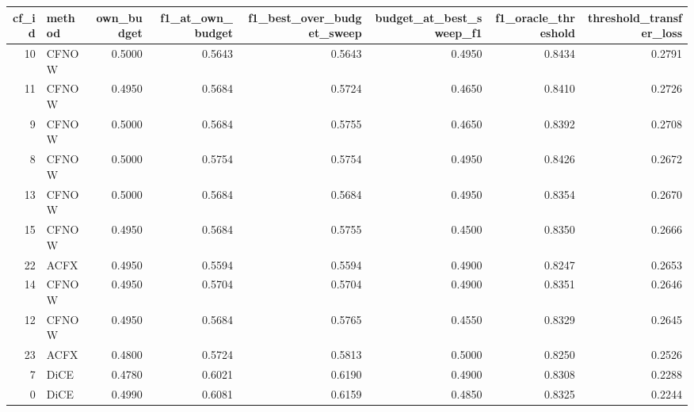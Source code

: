 \begin{tabular}{rlrrrrrr}
\toprule
 cf\_id & method &  own\_budget &  f1\_at\_own\_budget &  f1\_best\_over\_budget\_sweep &  budget\_at\_best\_sweep\_f1 &  f1\_oracle\_threshold &  threshold\_transfer\_loss \\
\midrule
    10 &  CFNOW &      0.5000 &            0.5643 &                     0.5643 &                   0.4950 &               0.8434 &                   0.2791 \\
    11 &  CFNOW &      0.4950 &            0.5684 &                     0.5724 &                   0.4650 &               0.8410 &                   0.2726 \\
     9 &  CFNOW &      0.5000 &            0.5684 &                     0.5755 &                   0.4650 &               0.8392 &                   0.2708 \\
     8 &  CFNOW &      0.5000 &            0.5754 &                     0.5754 &                   0.4950 &               0.8426 &                   0.2672 \\
    13 &  CFNOW &      0.5000 &            0.5684 &                     0.5684 &                   0.4950 &               0.8354 &                   0.2670 \\
    15 &  CFNOW &      0.4950 &            0.5684 &                     0.5755 &                   0.4500 &               0.8350 &                   0.2666 \\
    22 &   ACFX &      0.4950 &            0.5594 &                     0.5594 &                   0.4900 &               0.8247 &                   0.2653 \\
    14 &  CFNOW &      0.4950 &            0.5704 &                     0.5704 &                   0.4900 &               0.8351 &                   0.2646 \\
    12 &  CFNOW &      0.4950 &            0.5684 &                     0.5765 &                   0.4550 &               0.8329 &                   0.2645 \\
    23 &   ACFX &      0.4800 &            0.5724 &                     0.5813 &                   0.5000 &               0.8250 &                   0.2526 \\
     7 &   DiCE &      0.4780 &            0.6021 &                     0.6190 &                   0.4900 &               0.8308 &                   0.2288 \\
     0 &   DiCE &      0.4990 &            0.6081 &                     0.6159 &                   0.4850 &               0.8325 &                   0.2244 \\

\end{tabular}
